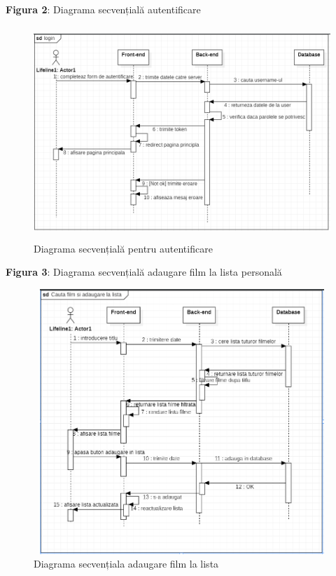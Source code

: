 \par \textbf{Figura 2}: Diagrama secvențială autentificare
		\begin{figure}[htbp]
			\centerline{\includegraphics[width=13cm, height=8cm]{figures/login diagrma secventiala.png}}
			\caption{Diagrama secvențială pentru autentificare}
			\label{fig}
		\end{figure}
\newline
\newline
\newline
\newline
\newline
\par \textbf{Figura 3}: Diagrama secvențială adaugare film la lista personală
		\begin{figure}[!h]
			\centerline{\includegraphics[width=14cm, height=10cm]{figures/cauta si adauga.png}}
			\caption{Diagrama secvențiala adaugare film la lista}
			\label{fig}
		\end{figure}

